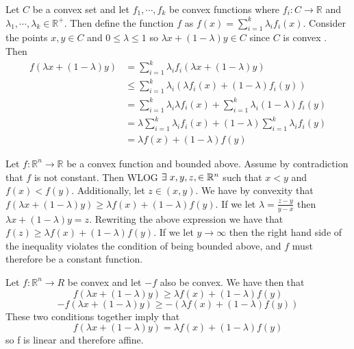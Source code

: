 \documentclass[12pt]{article}
\newcommand{\R}{\mathbb{R}}
\newenvironment{problem}[2][Problem]{\begin{trivlist}
\item[\hskip \labelsep {\bfseries #1}\hskip \labelsep {\bfseries #2}]}{\end{trivlist}}
\begin{document}
\begin{problem}{7.} 
Let $C$ be a convex set and let $f_1, \cdots, f_k$ be convex functions where $f_i:C \to \R$ and $\lambda_1, \cdots, \lambda_k \in \R^+$. Then define the function $f$ as $f(x) = \sum_{i=1}^{k} \lambda_if_i(x)$. Consider the points $x, y \in C$ and $0 \leq \lambda \leq 1$ so $\lambda x + (1-\lambda)y \in C$ since $C$ is convex . Then
\begin{align*}
 f(\lambda x + (1-\lambda)y) &= \sum_{i=1}^{k} \lambda_if_i(\lambda x + (1-\lambda)y) \\
 & \leq \sum_{i=1}^{k} \lambda_i (\lambda f_i(x) + (1-\lambda)f_i(y))   \\
  & =\sum_{i=1}^{k} \lambda_i \lambda f_i(x) + \sum_{i=1}^{k}  \lambda_i(1-\lambda)f_i(y) \\
  & =\lambda  \sum_{i=1}^{k} \lambda_i f_i(x) + (1-\lambda) \sum_{i=1}^{k}  \lambda_if_i(y) \\
  & = \lambda f(x) + (1- \lambda) f(y)
 \end{align*}
\end{problem}

\begin{problem}{13.} 
Let $f: \R^n \to \R$ be a convex function and bounded above. Assume by contradiction that $f$ is not constant. Then WLOG $\exists \hspace{0.1cm} x,y, z, \in \R^n$ such that $x <y $ and $f(x) < f(y)$. Additionally, let  $z \in (x,y)$. We have by convexity that $f(\lambda x + (1-\lambda) y) \geq \lambda f(x) + (1 - \lambda) f(y)$. If we let $\lambda  = \frac{z-y}{y-x}$ then $\lambda x + (1-\lambda) y = z$. Rewriting the above expression we have that $f(z) \geq \lambda f(x) + (1 - \lambda) f(y)$. If we let $y \to \infty$ then the right hand side of the inequality violates the condition of being bounded above, and $f$ must therefore be a constant function. 
\end{problem}

\begin{problem}{20.} 
Let $f: \R^n \to R$ be convex and let $-f$ also be convex. We have then that 
$$f(\lambda x + (1-\lambda) y) \geq \lambda f(x) + (1 - \lambda) f(y)$$
$$- f(\lambda x + (1-\lambda) y) \geq - (\lambda f(x) + (1 - \lambda) f(y))$$
These two conditions together imply that 
$$f(\lambda x + (1-\lambda) y) = \lambda f(x) + (1 - \lambda) f(y)$$
so f is linear and therefore affine. 
\end{problem}
\end{document}
